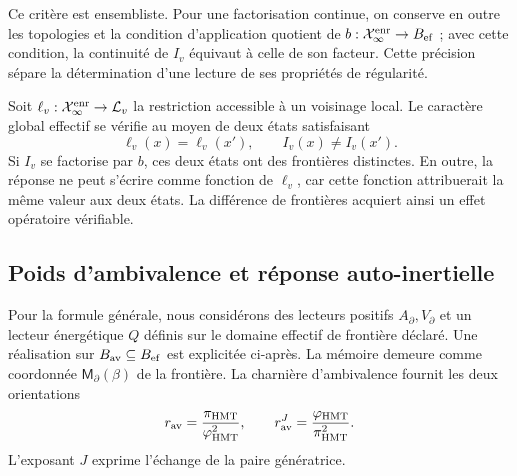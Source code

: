 Ce critère est ensembliste. Pour une factorisation continue, on
conserve en outre les topologies et la condition d'application quotient
de \(b:\mathcal X_\infty^{\rm enr}\to B_{\rm ef}\) ; avec cette condition, la
continuité de \(I_v\) équivaut à celle de son facteur. Cette précision
sépare la détermination d'une lecture de ses propriétés de régularité.

Soit \(\ell_v:\mathcal X_\infty^{\rm enr}\to\mathcal L_v\) la restriction accessible à un voisinage local. Le caractère global effectif se vérifie au moyen de deux états satisfaisant
\begin{equation}
 \ell_v(x)=\ell_v(x'),\qquad I_v(x)\neq I_v(x').
 \label{vii:eq:observador-testigo-global}
\end{equation}
Si \(I_v\) se factorise par \(b\), ces deux états ont des frontières
distinctes. En outre, la réponse ne peut s'écrire comme fonction de
\(\ell_v\), car cette fonction attribuerait la même valeur aux deux états.
La différence de frontières acquiert ainsi un effet opératoire vérifiable.

\subsection{Poids d'ambivalence et réponse auto-inertielle}
\label{vii:sec:observador-ambivalencia}

Pour la formule générale, nous considérons des lecteurs positifs
\(A_\partial,V_\partial\) et un lecteur énergétique \(Q\)
définis sur le domaine effectif de frontière déclaré.
Une réalisation sur
\(B_{\rm av}\subseteq B_{\rm ef}\) est explicitée ci-après. La mémoire demeure comme coordonnée
\(\mathsf M_\partial(\beta)\) de la frontière. La charnière
d'ambivalence fournit les deux orientations
\[
 r_{\rm av}=\frac{\pi_{\rm HMT}}{\varphi_{\rm HMT}^2},\qquad
 r_{\rm av}^{J}=\frac{\varphi_{\rm HMT}}{\pi_{\rm HMT}^2}.
\]
L'exposant \(J\) exprime l'échange de la paire génératrice.

